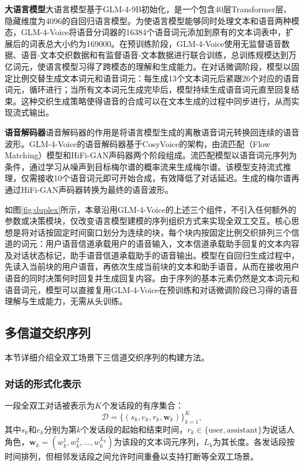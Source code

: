 \textbf{大语言模型}\quad 大语言模型基于GLM-4-9B\citep{glm2024chatglm}初始化，是一个包含40层Transformer层、隐藏维度为4096的自回归语言模型。为使语言模型能够同时处理文本和语音两种模态，GLM-4-Voice将语音分词器的16384个语音词元添加到原有的文本词表中，扩展后的词表总大小约为169000。在预训练阶段，GLM-4-Voice使用无监督语音数据、语音-文本交织数据和有监督语音-文本数据进行联合训练，总训练规模达到万亿词元，使语言模型习得了跨模态的理解和生成能力。在对话微调阶段，模型以固定比例交替生成文本词元和语音词元：每生成13个文本词元后紧跟26个对应的语音词元，循环进行；当所有文本词元生成完毕后，模型持续生成语音词元直至回复结束。这种交织生成策略使得语音的合成可以在文本生成的过程中同步进行，从而实现流式输出。

\textbf{语音解码器}\quad 语音解码器的作用是将语言模型生成的离散语音词元转换回连续的语音波形。GLM-4-Voice的语音解码器基于CosyVoice\citep{du2024cosyvoice}的架构，由流匹配（Flow Matching）\citep{lipman2023flow}模型和HiFi-GAN\citep{hifigan}声码器两个阶段组成。流匹配模型以语音词元序列为条件，通过学习从噪声到目标梅尔谱的概率流来生成梅尔谱。该模型支持流式推理，仅需接收10个语音词元即可开始合成，有效降低了对话延迟。生成的梅尔谱再通过HiFi-GAN声码器转换为最终的语音波形。

如图\ref{fig:duplex}所示，本章沿用GLM-4-Voice的上述三个组件，不引入任何额外的参数或决策模块，仅改变语言模型建模的序列组织方式来实现全双工交互。核心思想是将对话按固定时间窗口划分为连续的块，每个块内按固定比例交织排列三个信道的词元：用户语音信道承载用户的语音输入，文本信道承载助手回复的文本内容及对话状态标记，助手语音信道承载助手的语音输出。模型在自回归生成过程中，先读入当前块的用户语音，再依次生成当前块的文本和助手语音，从而在接收用户语音的同时决策何时回复并生成回复内容。由于序列的基本元素仍然是文本词元和语音词元，模型可以直接复用GLM-4-Voice在预训练和对话微调阶段已习得的语音理解与生成能力，无需从头训练。



\subsection{多信道交织序列}

本节详细介绍全双工场景下三信道交织序列的构建方法。

\subsubsection{对话的形式化表示}

一段全双工对话被表示为$K$个发话段的有序集合：
\begin{equation}
    \mathcal{D} = \{(s_k, e_k, r_k, \mathbf{w}_k)\}_{k=1}^{K},
\end{equation}
其中$s_k$和$e_k$分别为第$k$个发话段的起始和结束时间，$r_k \in \{\text{user}, \text{assistant}\}$为说话人角色，$\mathbf{w}_k = (w_k^1, w_k^2, \ldots, w_k^{L_k})$为该段的文本词元序列，$L_k$为其长度。各发话段按时间排列，但相邻发话段之间允许时间重叠以支持打断等全双工场景。


